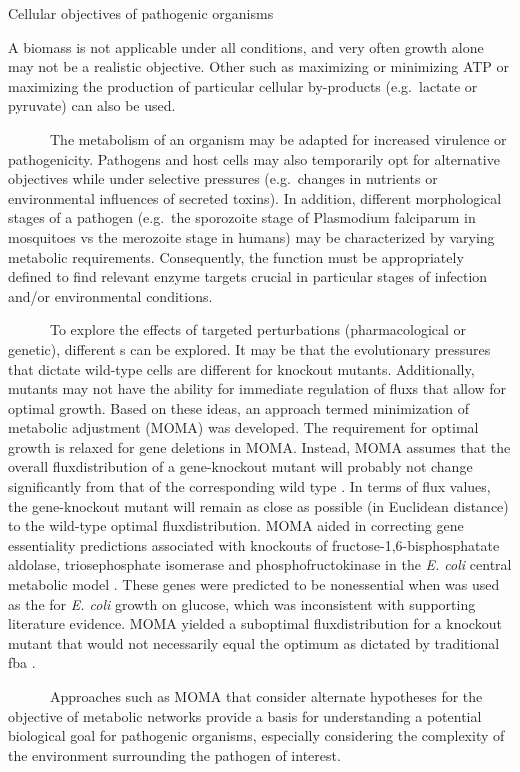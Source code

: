 \begin{pabox}[label=trends:box:objective,float*=h!,width=\textwidth]{Cellular objectives of pathogenic organisms}
\small
\begin{multicols}{2}
A \gls{biomass} is not applicable under 
all conditions, and very often growth alone may not be 
a realistic objective. Other  such as maximizing 
or minimizing ATP or maximizing the production of 
particular cellular by-products (e.g.\ lactate or pyruvate) 
can also be used.

~~~~~~The metabolism of an organism may be adapted for increased 
virulence or pathogenicity. Pathogens and host cells may 
also temporarily opt for alternative objectives while under 
selective pressures (e.g.\ changes in nutrients or 
environmental influences of secreted toxins). In addition, 
different morphological stages of a pathogen (e.g.\ the sporozoite 
stage of Plasmodium falciparum in mosquitoes vs the merozoite 
stage in humans) may be characterized by varying metabolic 
requirements. Consequently, the  function must be 
appropriately defined to find relevant enzyme targets crucial 
in particular stages of infection and/or environmental conditions.

~~~~~~To explore the effects of targeted perturbations 
(pharmacological or genetic), different s 
can be explored. It may be that the evolutionary 
pressures that dictate wild-type cells are different 
for knockout mutants. Additionally, mutants may 
not have the ability for immediate regulation of 
\glspl{flux} that allow for optimal growth. Based on these 
ideas, an approach termed minimization of metabolic 
adjustment (MOMA) was developed. The requirement for 
optimal growth is relaxed for gene deletions in MOMA. 
Instead, MOMA assumes that the overall \gls{fluxdistribution} 
of a gene-knockout mutant will probably not change 
significantly from that of the corresponding wild type \cite{Segre:2002jp}. 
In terms of \gls{flux} values, the gene-knockout mutant will 
remain as close as possible (in Euclidean distance) to 
the wild-type optimal \gls{fluxdistribution}. MOMA aided in correcting 
gene essentiality predictions associated with knockouts 
of fructose-1,6-bisphosphatate aldolase, triosephosphate 
isomerase and phosphofructokinase in the \textit{E. coli }
central metabolic model \cite{Segre:2002jp}. These genes were predicted 
to be nonessential when  was used as the  
for \textit{E. coli} growth on glucose, which was inconsistent with 
supporting literature evidence. MOMA yielded a suboptimal 
\gls{fluxdistribution} for a knockout mutant that would not 
necessarily equal the optimum as dictated by traditional 
\gls{fba} \cite{Segre:2002jp}.

~~~~~~Approaches such as MOMA that consider alternate hypotheses 
for the objective of metabolic networks provide a basis 
for understanding a potential biological goal for pathogenic 
organisms, especially considering the complexity of the 
environment surrounding the pathogen of interest.
\end{multicols}

\end{pabox}
